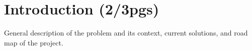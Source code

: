 
%
%

\section{Introduction (2/3pgs)}

General description of the problem and its context, current solutions, and road map of the project.
